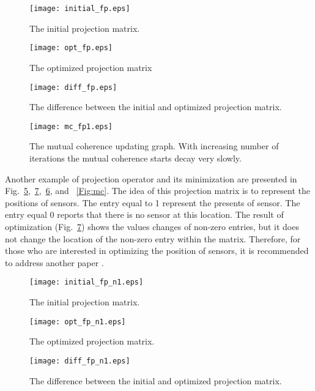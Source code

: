 \documentclass[journal]{IEEEtran}
\begin{document}
\begin{figure}[!h]
\centering
\texttt{[image: initial\_fp.eps]}
\caption{The initial projection matrix.}
\label{Fig:initial_rand}
\end{figure}

\begin{figure}[!h]
\centering
\texttt{[image: opt\_fp.eps]}
\caption{The optimized projection matrix}
\label{Fig:opt_rand}
\end{figure}

\begin{figure}[!h]
\centering
\texttt{[image: diff\_fp.eps]}
\caption{The difference between the initial and optimized projection matrix.}
\label{Fig:diff_rand}
\end{figure}

\begin{figure}[!h]
\centering
\texttt{[image: mc\_fp1.eps]}
\caption{The mutual coherence updating graph. With increasing number of iterations the mutual coherence starts decay very slowly.}
\label{Fig:mc_rand}
\end{figure}

Another example of projection operator and its minimization are presented in Fig.~\ref{Fig:initial},~\ref{Fig:opt},~\ref{Fig:diff}, and ~\ref{Fig:mc}. The idea of this projection matrix is to represent the positions of sensors. The entry equal to 1 represent the presents of sensor. The entry equal 0 reports that there is no sensor at this location. The result of optimization (Fig.~\ref{Fig:opt}) shows the values changes of non-zero entries, but it does not change the location of the non-zero entry within the matrix. Therefore, for those who are interested in optimizing the position of sensors, it is recommended to address another paper \cite{Obermeier}.


\begin{figure}[!h]
\centering
\texttt{[image: initial\_fp\_n1.eps]}
\caption{The initial projection matrix.}
\label{Fig:initial}
\end{figure}

\begin{figure}[!h]
\centering
\texttt{[image: opt\_fp\_n1.eps]}
\caption{The optimized projection matrix.}
\label{Fig:diff}
\end{figure}

\begin{figure}[!h]
\centering
\texttt{[image: diff\_fp\_n1.eps]}
\caption{The difference between the initial and optimized projection matrix.}
\label{Fig:opt}
\end{figure}
\end{document}
